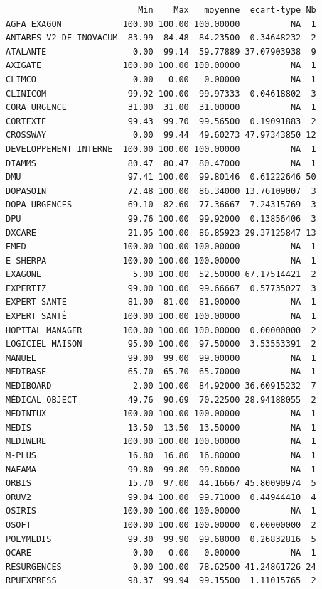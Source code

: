 \documentclass[]{article}
\begin{document}
\begin{verbatim}
                          Min    Max   moyenne  ecart-type Nb
AGFA EXAGON            100.00 100.00 100.00000          NA  1
ANTARES V2 DE INOVACUM  83.99  84.48  84.23500  0.34648232  2
ATALANTE                 0.00  99.14  59.77889 37.07903938  9
AXIGATE                100.00 100.00 100.00000          NA  1
CLIMCO                   0.00   0.00   0.00000          NA  1
CLINICOM                99.92 100.00  99.97333  0.04618802  3
CORA URGENCE            31.00  31.00  31.00000          NA  1
CORTEXTE                99.43  99.70  99.56500  0.19091883  2
CROSSWAY                 0.00  99.44  49.60273 47.97343850 12
DEVELOPPEMENT INTERNE  100.00 100.00 100.00000          NA  1
DIAMMS                  80.47  80.47  80.47000          NA  1
DMU                     97.41 100.00  99.80146  0.61222646 50
DOPASOIN                72.48 100.00  86.34000 13.76109007  3
DOPA URGENCES           69.10  82.60  77.36667  7.24315769  3
DPU                     99.76 100.00  99.92000  0.13856406  3
DXCARE                  21.05 100.00  86.85923 29.37125847 13
EMED                   100.00 100.00 100.00000          NA  1
E SHERPA               100.00 100.00 100.00000          NA  1
EXAGONE                  5.00 100.00  52.50000 67.17514421  2
EXPERTIZ                99.00 100.00  99.66667  0.57735027  3
EXPERT SANTE            81.00  81.00  81.00000          NA  1
EXPERT SANTÉ           100.00 100.00 100.00000          NA  1
HOPITAL MANAGER        100.00 100.00 100.00000  0.00000000  2
LOGICIEL MAISON         95.00 100.00  97.50000  3.53553391  2
MANUEL                  99.00  99.00  99.00000          NA  1
MEDIBASE                65.70  65.70  65.70000          NA  1
MEDIBOARD                2.00 100.00  84.92000 36.60915232  7
MÉDICAL OBJECT          49.76  90.69  70.22500 28.94188055  2
MEDINTUX               100.00 100.00 100.00000          NA  1
MEDIS                   13.50  13.50  13.50000          NA  1
MEDIWERE               100.00 100.00 100.00000          NA  1
M-PLUS                  16.80  16.80  16.80000          NA  1
NAFAMA                  99.80  99.80  99.80000          NA  1
ORBIS                   15.70  97.00  44.16667 45.80090974  5
ORUV2                   99.04 100.00  99.71000  0.44944410  4
OSIRIS                 100.00 100.00 100.00000          NA  1
OSOFT                  100.00 100.00 100.00000  0.00000000  2
POLYMEDIS               99.30  99.90  99.68000  0.26832816  5
QCARE                    0.00   0.00   0.00000          NA  1
RESURGENCES              0.00 100.00  78.62500 41.24861726 24
RPUEXPRESS              98.37  99.94  99.15500  1.11015765  2

\end{verbatim}
\end{document}
